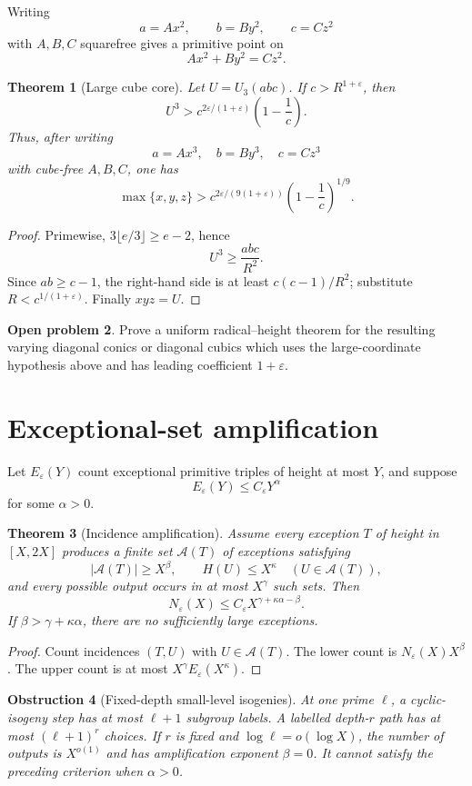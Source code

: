 \documentclass[11pt]{amsart}
\newtheorem{theorem}{Theorem}[section]
\newtheorem{obstruction}[theorem]{Obstruction}
\theoremstyle{definition}
\newtheorem{problem}[theorem]{Open problem}
\theoremstyle{remark}
\newcommand{\eps}{\varepsilon}
\begin{document}
Writing
\[
 a=A x^2,\qquad b=B y^2,\qquad c=C z^2
\]
with $A,B,C$ squarefree gives a primitive point on
\[
 A x^2+B y^2=C z^2.
\]

\begin{theorem}[Large cube core]
Let $U=U_3(abc)$.  If $c>R^{1+\eps}$, then
\[
 U^3>c^{2\eps/(1+\eps)}\left(1-\frac1c\right).
\]
Thus, after writing
\[
 a=A x^3,\quad b=B y^3,\quad c=C z^3
\]
with cube-free $A,B,C$, one has
\[
 \max\{x,y,z\}>
 c^{2\eps/(9(1+\eps))}\left(1-\frac1c\right)^{1/9}.
\]
\end{theorem}

\begin{proof}
Primewise, $3\lfloor e/3\rfloor\ge e-2$, hence
\[
 U^3\ge \frac{abc}{R^2}.
\]
Since $ab\ge c-1$, the right-hand side is at least $c(c-1)/R^2$; substitute $R<c^{1/(1+\eps)}$.  Finally $xyz=U$.
\end{proof}

\begin{problem}
Prove a uniform radical--height theorem for the resulting varying diagonal conics or diagonal cubics which uses the large-coordinate hypothesis above and has leading coefficient $1+\eps$.
\end{problem}

\section{Exceptional-set amplification}

Let $E_\eps(Y)$ count exceptional primitive triples of height at most $Y$, and suppose
\[
 E_\eps(Y)\le C_\eps Y^\alpha
\]
for some $\alpha>0$.

\begin{theorem}[Incidence amplification]
Assume every exception $T$ of height in $[X,2X]$ produces a finite set $\mathcal A(T)$ of exceptions satisfying
\[
 |\mathcal A(T)|\ge X^\beta,
 \qquad H(U)\le X^\kappa\quad(U\in\mathcal A(T)),
\]
and every possible output occurs in at most $X^\gamma$ such sets.  Then
\[
 N_\eps(X)\le C_\eps X^{\gamma+\kappa\alpha-\beta}.
\]
If $\beta>\gamma+\kappa\alpha$, there are no sufficiently large exceptions.
\end{theorem}

\begin{proof}
Count incidences $(T,U)$ with $U\in\mathcal A(T)$.  The lower count is
$N_\eps(X)X^\beta$.  The upper count is at most
$X^\gamma E_\eps(X^\kappa)$.
\end{proof}

\begin{obstruction}[Fixed-depth small-level isogenies]
At one prime $\ell$, a cyclic-isogeny step has at most $\ell+1$ subgroup labels.  A labelled depth-$r$ path has at most $(\ell+1)^r$ choices.  If $r$ is fixed and $\log\ell=o(\log X)$, the number of outputs is $X^{o(1)}$ and has amplification exponent $\beta=0$.  It cannot satisfy the preceding criterion when $\alpha>0$.
\end{obstruction}
\end{document}
